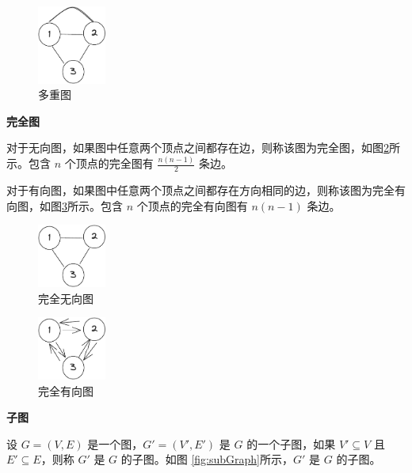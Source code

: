 \documentclass[lang=cn,newtx,10pt,scheme=chinese]{../elegantbook}
\begin{document}
  \begin{figure}[h!]
    \centering
    \includegraphics[width=0.2\textwidth]{./figure/pdf/cropped/mutipleGraph.pdf}
    \caption{多重图}
    \label{fig:multipleGraph}
  \end{figure}

\textbf{完全图}

对于无向图，如果图中任意两个顶点之间都存在边，则称该图为完全图，如图\ref{fig:completeGraph}所示。包含 $n$ 个顶点的完全图有 $\frac{n(n-1)}{2}$ 条边。

对于有向图，如果图中任意两个顶点之间都存在方向相同的边，则称该图为完全有向图，如图\ref{fig:completeDirectedGraph}所示。包含 $n$ 个顶点的完全有向图有 $n(n-1)$ 条边。

\begin{figure}[h!]
  \centering
  \includegraphics[width=0.2\textwidth]{./figure/pdf/cropped/unDirection.pdf}
  \caption{完全无向图}
  \label{fig:completeGraph}

\end{figure}

\begin{figure}[h!]
  \centering
  \includegraphics[width=0.2\textwidth]{./figure/pdf/cropped/directedComGraph.pdf}
  \caption{完全有向图}
  \label{fig:completeDirectedGraph}
\end{figure}


\textbf{子图}

设 $G = (V, E)$ 是一个图，$G' = (V', E')$ 是 $G$ 的一个子图，如果 $V' \subseteq V$ 且 $E' \subseteq E$，则称 $G'$ 是 $G$ 的子图。如图 \ref{fig:subGraph}所示，$G'$ 是 $G$ 的子图。
\end{document}
